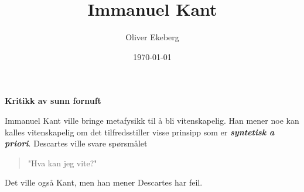 \documentclass[11pt, a4paper]{article}
\title{Immanuel Kant}
\author{Oliver Ekeberg}
\date{\today}
\newenvironment{sectionbox}[1][]{%
    \begin{sectionboxinner}
    \textbf{\large #1}
    \vspace{1pt}
    \newline
}{%
    \end{sectionboxinner}
}
\begin{document}
\maketitle

\tableofcontents


\begin{sectionbox}[Kritikk av sunn fornuft]


    Immanuel Kant ville bringe metafysikk til å bli vitenskapelig. Han mener noe kan kalles vitenskapelig om det tilfredsstiller visse prinsipp som er \textbf{\textit{syntetisk a priori}}. Descartes ville svare spørsmålet 
    \begin{quote}
        "Hva kan jeg vite?"
    \end{quote}
    Det ville også Kant, men han mener Descartes har feil.
    
\end{sectionbox}
\end{document}
